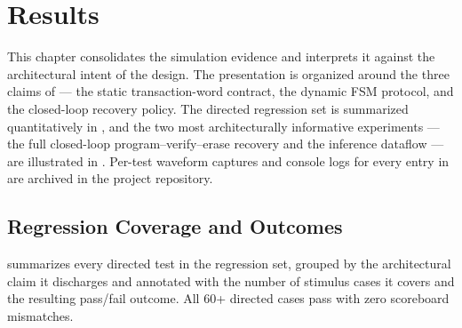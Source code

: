 
\chapter{Results}
\label{ch:results}

This chapter consolidates the simulation evidence and interprets it
against the architectural intent of the design. The presentation is
organized around the three claims of  --- the
static transaction-word contract, the dynamic FSM protocol, and the
closed-loop recovery policy. The directed regression set is summarized
quantitatively in , and the two most
architecturally informative experiments --- the full closed-loop
program--verify--erase recovery and the inference dataflow --- are
illustrated in
. Per-test waveform
captures and console logs for every entry in 
are archived in the project repository.

\section{Regression Coverage and Outcomes}
\label{sec:results-summary}

 summarizes every directed test in the
regression set, grouped by the architectural claim it discharges and
annotated with the number of stimulus cases it covers and the resulting
pass/fail outcome. All 60+ directed cases pass with zero scoreboard
mismatches.

